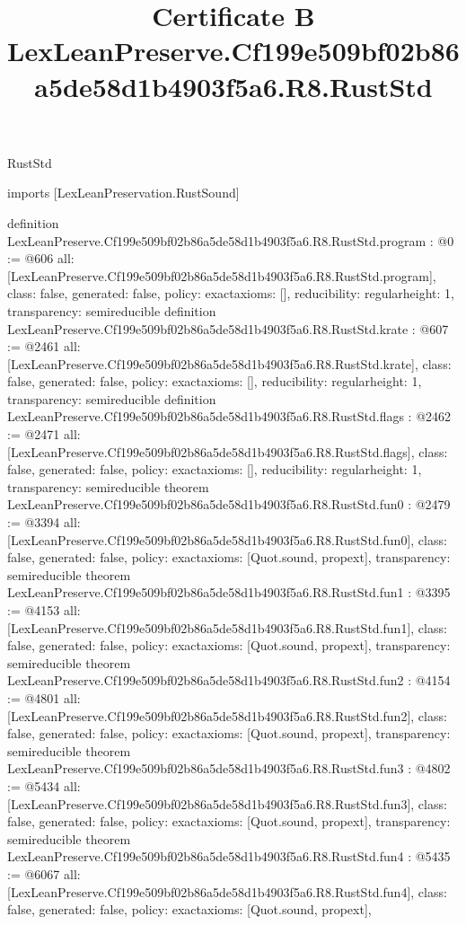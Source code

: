 \begin{lexlean}{RustStd}
\title{Certificate B LexLeanPreserve.Cf199e509bf02b86a5de58d1b4903f5a6.R8.RustStd}
\begin{coremodule}
imports [LexLeanPreservation.RustSound]

definition LexLeanPreserve.Cf199e509bf02b86a5de58d1b4903f5a6.R8.RustStd.program : @0 := @606 {
  all: [LexLeanPreserve.Cf199e509bf02b86a5de58d1b4903f5a6.R8.RustStd.program],
  class: false,
  generated: false,
  policy: exact{axioms: []},
  reducibility: regular{height: 1},
  transparency: semireducible
}
definition LexLeanPreserve.Cf199e509bf02b86a5de58d1b4903f5a6.R8.RustStd.krate : @607 := @2461 {
  all: [LexLeanPreserve.Cf199e509bf02b86a5de58d1b4903f5a6.R8.RustStd.krate],
  class: false,
  generated: false,
  policy: exact{axioms: []},
  reducibility: regular{height: 1},
  transparency: semireducible
}
definition LexLeanPreserve.Cf199e509bf02b86a5de58d1b4903f5a6.R8.RustStd.flags : @2462 := @2471 {
  all: [LexLeanPreserve.Cf199e509bf02b86a5de58d1b4903f5a6.R8.RustStd.flags],
  class: false,
  generated: false,
  policy: exact{axioms: []},
  reducibility: regular{height: 1},
  transparency: semireducible
}
theorem LexLeanPreserve.Cf199e509bf02b86a5de58d1b4903f5a6.R8.RustStd.fun0 : @2479 := @3394 {
  all: [LexLeanPreserve.Cf199e509bf02b86a5de58d1b4903f5a6.R8.RustStd.fun0],
  class: false,
  generated: false,
  policy: exact{axioms: [Quot.sound, propext]},
  transparency: semireducible
}
theorem LexLeanPreserve.Cf199e509bf02b86a5de58d1b4903f5a6.R8.RustStd.fun1 : @3395 := @4153 {
  all: [LexLeanPreserve.Cf199e509bf02b86a5de58d1b4903f5a6.R8.RustStd.fun1],
  class: false,
  generated: false,
  policy: exact{axioms: [Quot.sound, propext]},
  transparency: semireducible
}
theorem LexLeanPreserve.Cf199e509bf02b86a5de58d1b4903f5a6.R8.RustStd.fun2 : @4154 := @4801 {
  all: [LexLeanPreserve.Cf199e509bf02b86a5de58d1b4903f5a6.R8.RustStd.fun2],
  class: false,
  generated: false,
  policy: exact{axioms: [Quot.sound, propext]},
  transparency: semireducible
}
theorem LexLeanPreserve.Cf199e509bf02b86a5de58d1b4903f5a6.R8.RustStd.fun3 : @4802 := @5434 {
  all: [LexLeanPreserve.Cf199e509bf02b86a5de58d1b4903f5a6.R8.RustStd.fun3],
  class: false,
  generated: false,
  policy: exact{axioms: [Quot.sound, propext]},
  transparency: semireducible
}
theorem LexLeanPreserve.Cf199e509bf02b86a5de58d1b4903f5a6.R8.RustStd.fun4 : @5435 := @6067 {
  all: [LexLeanPreserve.Cf199e509bf02b86a5de58d1b4903f5a6.R8.RustStd.fun4],
  class: false,
  generated: false,
  policy: exact{axioms: [Quot.sound, propext]},
}
\end{coremodule}
\end{lexlean}
